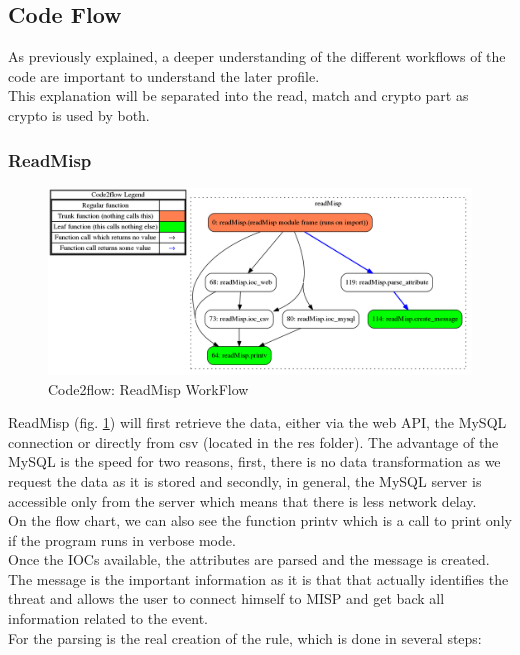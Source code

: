 \documentclass{eplmastersthesis}
\begin{document}
\subsection{Code Flow}
As previously explained, a deeper understanding of the different workflows of the code are important to understand the later profile.\\
This explanation will be separated into the read, match and crypto part as crypto is used by both.

\subsubsection{ReadMisp}
\begin{figure}[h!]
\begin{center}
	\includegraphics[scale=0.3]{res/flowReadMisp}
	\caption{Code2flow: ReadMisp WorkFlow}
	\label{code2flow-readMisp}
\end{center}
\end{figure}
ReadMisp (fig. \ref{code2flow-readMisp}) will first retrieve the data, either via the web API, the MySQL connection or directly from csv (located in the res folder). The advantage of the MySQL is the speed for two reasons, first, there is no data transformation as we request the data as it is stored and secondly, in general, the MySQL server is accessible only from the server which means that there is less network delay.\\
On the flow chart, we can also see the function printv which is a call to print only if the program runs in verbose mode.\\
Once the IOCs available, the attributes are parsed and the message is created. The message is the important information as it is that that actually identifies the threat and allows the user to connect himself to MISP and get back all information related to the event.\\
For the parsing is the real creation of the rule, which is done in several steps:
\end{document}
